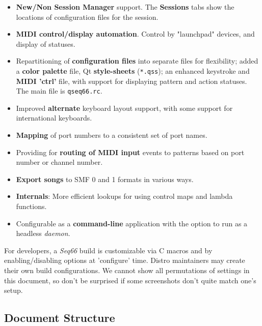 \documentclass[
 11pt,
 twoside,
 a4paper,
 final                                 %
]{article}
\begin{document}
\begin{itemize}
         \textbf{(N)RPN} for editing RPN and other macros, loading,
         and saving;
         \textbf{Calculations} for converting hex/decimal numbers and
         variable-length MIDI values;
         and \textbf{Preferences} for a raft of settings and configuration
         information.
      \item \textbf{New/Non Session Manager} support.
         The \textbf{Sessions} tabs show the
         locations of configuration files for the session.
      \item \textbf{MIDI control/display automation}.
         Control by "launchpad" devices, and display of statuses.
      \item Repartitioning of \textbf{configuration files} into separate files
         for flexibility; added a \textbf{color palette} file,
         Qt \textbf{style-sheets} (\texttt{*.qss});
         an enhanced keystroke and \textbf{MIDI 'ctrl'} file, with
         support for displaying pattern and action statuses.
         The main file is \texttt{qseq66.rc}.
      \item Improved \textbf{alternate} keyboard layout support, with
         some support for international keyboards.
      \item \textbf{Mapping} of port numbers to a consistent set of port names.
      \item Providing for \textbf{routing of MIDI input} events to
         patterns based on port number or channel number.
      \item \textbf{Export songs} to SMF 0 and 1 formats in various ways.
      \item \textbf{Internals}:
         More efficient lookups for using control maps and lambda functions.
      \item Configurable as a \textbf{command-line} application
         with the option to run as a headless \textsl{daemon}.
   \end{itemize}

   For developers, a \textsl{Seq66} build is customizable via C macros and by
   enabling/disabling options at 'configure' time.
   Distro maintainers may create their own build configurations.
   We cannot show all permutations of settings in this document,
   so don't be surprised if some screenshots don't quite match one's setup.

\subsection{Document Structure}
\label{subsec:introduction_document_structure}
\end{document}
